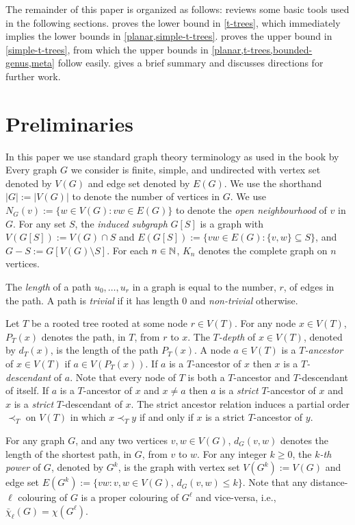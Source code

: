 \documentclass[kpfonts]{patmorin}
\newcommand{\dlcn}{\bar{\chi}_\ell}
\theoremstyle{named}
\begin{document}
The remainder of this paper is organized as follows:  reviews some basic tools used in the following sections.    proves the lower bound in \cref{t-trees}, which immediately implies the lower bounds in \cref{planar,simple-t-trees}.  proves the upper bound in \cref{simple-t-trees}, from which the upper bounds in \cref{planar,t-trees,bounded-genus,meta} follow easily.   gives a brief summary and discusses directions for further work.

\section{Preliminaries}

In this paper we use standard graph theory terminology as used in the book by \citet{diestel:graph}
Every graph $G$ we consider is finite, simple, and undirected with vertex set denoted by $V(G)$ and edge set denoted by $E(G)$.  We use the shorthand $|G|:=|V(G)|$ to denote the number of vertices in $G$.  We use $N_G(v):=\{w\in V(G): vw\in E(G)\}$ to denote the \emph{open neighbourhood} of $v$ in $G$.  For any set $S$, the \emph{induced subgraph}  $G[S]$ is a graph with $V(G[S]):=V(G)\cap S$ and $E(G[S]):=\{vw\in E(G): \{v,w\}\subseteq S\}$, and $G-S:=G[V(G)\setminus S]$. For each $n\in\mathbb{N}$, $K_n$ denotes the complete graph on $n$ vertices.

The \emph{length} of a path $u_0,\ldots,u_r$ in a graph is equal to the number, $r$, of edges in the path. A path is \emph{trivial} if it has length 0 and \emph{non-trivial} otherwise.

Let $T$ be a rooted tree rooted at some node $r\in V(T)$.  For any node $x\in V(T)$, $P_T(x)$ denotes the path, in $T$, from $r$ to $x$.  The \emph{$T$-depth} of $x\in V(T)$, denoted by $d_T(x)$, is the length of the path $P_T(x)$.  A node $a\in V(T)$ is a \emph{$T$-ancestor} of $x\in V(T)$ if $a\in V(P_T(x))$. If $a$ is a $T$-ancestor of $x$ then $x$ is a \emph{$T$-descendant} of $a$.  Note that every node of $T$ is both a $T$-ancestor and $T$-descendant of itself.  If $a$ is a $T$-ancestor of $x$ and $x\neq a$ then $a$ is a \emph{strict} $T$-ancestor of $x$ and $x$ is a \emph{strict} $T$-descendant of $x$.  The strict ancestor relation induces a partial order $\prec_T$ on $V(T)$ in which $x\prec_T y$ if and only if $x$ is a strict $T$-ancestor of $y$.

For any graph $G$, and any two vertices $v,w\in V(G)$, $d_G(v,w)$ denotes the length of the shortest path, in $G$, from $v$ to $w$. For any integer $k\ge 0$, the \emph{$k$-th power} of $G$, denoted by $G^k$, is the graph with vertex set $V(G^k):=V(G)$ and edge set $E(G^{k}):=\{vw:v,w\in V(G),\,d_G(v,w)\le k\}$.
Note that any distance-$\ell$ colouring of $G$ is a proper colouring of $G^\ell$ and vice-versa, i.e., $\dlcn(G)=\chi(G^\ell)$.
\end{document}
